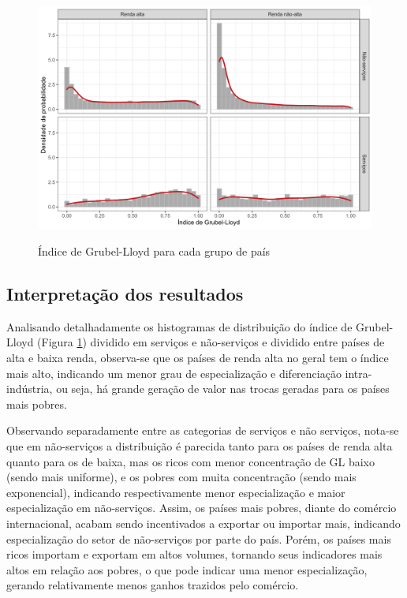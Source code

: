\begin{figure}[!h]
    \centering
    \caption{Índice de Grubel-Lloyd para cada grupo de país}
    \includegraphics*[width = 0.8\linewidth]{../plots/gl.png}
    \label{fig:gl}
\end{figure}

\subsection{Interpretação dos resultados}

Analisando detalhadamente os histogramas de distribuição do índice de Grubel-Lloyd (Figura \ref{fig:gl}) dividido em serviços e não-serviços e dividido entre países de alta e baixa renda, observa-se que os países de renda alta no geral tem o índice mais alto, indicando um menor grau de especialização e diferenciação intra-indústria, ou seja, há grande geração de valor nas trocas geradas para os países mais pobres.

Observando separadamente entre as categorias de serviços e não serviços, nota-se que em não-serviços a distribuição é parecida tanto para os países de renda alta quanto para os de baixa, mas os ricos com menor concentração de GL baixo (sendo mais uniforme), e os pobres com muita concentração (sendo mais exponencial), indicando respectivamente menor especialização e maior especialização em não-serviços. Assim, os países mais pobres, diante do comércio internacional, acabam sendo incentivados a exportar ou importar mais, indicando especialização do setor de não-serviços por parte do país. Porém, os países mais ricos importam e exportam em altos volumes, tornando seus indicadores mais altos em relação aos pobres, o que pode indicar uma menor especialização, gerando relativamente menos ganhos trazidos pelo comércio.

